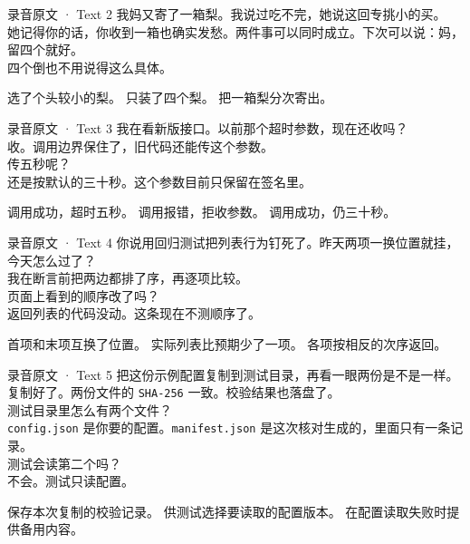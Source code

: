 \documentclass[UTF8, zihao=5, a4paper, fontset=fandol]{ctexart}
\begin{document}
\begin{ListeningScript}{录音原文 · Text 2}
\urole 我妈又寄了一箱梨。我说过吃不完，她说这回专挑小的买。\\
\arole 她记得你的话，你收到一箱也确实发愁。两件事可以同时成立。下次可以说：妈，留四个就好。\\
\urole 四个倒也不用说得这么具体。
\end{ListeningScript}
\threechoices
  {选了个头较小的梨。}
  {只装了四个梨。}
  {把一箱梨分次寄出。}

\begin{ListeningScript}{录音原文 · Text 3}
\urole 我在看新版接口。以前那个超时参数，现在还收吗？\\
\arole 收。调用边界保住了，旧代码还能传这个参数。\\
\urole 传五秒呢？\\
\arole 还是按默认的三十秒。这个参数目前只保留在签名里。
\end{ListeningScript}
\threechoices
  {调用成功，超时五秒。}
  {调用报错，拒收参数。}
  {调用成功，仍三十秒。}

\begin{ListeningScript}{录音原文 · Text 4}
\urole 你说用回归测试把列表行为钉死了。昨天两项一换位置就挂，今天怎么过了？\\
\arole 我在断言前把两边都排了序，再逐项比较。\\
\urole 页面上看到的顺序改了吗？\\
\arole 返回列表的代码没动。这条现在不测顺序了。
\end{ListeningScript}
\threechoices
  {首项和末项互换了位置。}
  {实际列表比预期少了一项。}
  {各项按相反的次序返回。}

\begin{ListeningScript}{录音原文 · Text 5}
\urole 把这份示例配置复制到测试目录，再看一眼两份是不是一样。\\
\arole 复制好了。两份文件的 \texttt{SHA-256} 一致。校验结果也落盘了。\\
\urole 测试目录里怎么有两个文件？\\
\arole \texttt{config.json} 是你要的配置。\texttt{manifest.json} 是这次核对生成的，里面只有一条记录。\\
\urole 测试会读第二个吗？\\
\arole 不会。测试只读配置。
\end{ListeningScript}
\threechoices
  {保存本次复制的校验记录。}
  {供测试选择要读取的配置版本。}
  {在配置读取失败时提供备用内容。}
\end{document}
